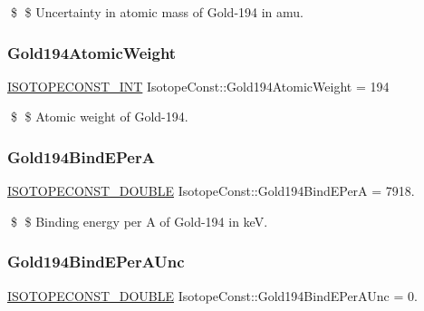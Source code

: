 \$ \$ Uncertainty in atomic mass of Gold-\/194 in amu. \mbox{\label{group___isotope_const-_gold-_au194_gaf6e772e3ead76240089b079afa13c11d}} 
\subsubsection{\texorpdfstring{Gold194\+Atomic\+Weight}{Gold194AtomicWeight}}
{\footnotesize\ttfamily \mbox{\hyperlink{group___isotope_const-_macros_ga5f18360b3e99483a35c32d789e62621c}{I\+S\+O\+T\+O\+P\+E\+C\+O\+N\+S\+T\+\_\+\+I\+NT}} Isotope\+Const\+::\+Gold194\+Atomic\+Weight = 194}

\$ \$ Atomic weight of Gold-\/194. \mbox{\label{group___isotope_const-_gold-_au194_ga600d1b0178a7d90eee789fe9be4b5f11}} 
\subsubsection{\texorpdfstring{Gold194\+Bind\+E\+PerA}{Gold194BindEPerA}}
{\footnotesize\ttfamily \mbox{\hyperlink{group___isotope_const-_macros_ga8f45a7272ce02c0b4c65c44636ed719a}{I\+S\+O\+T\+O\+P\+E\+C\+O\+N\+S\+T\+\_\+\+D\+O\+U\+B\+LE}} Isotope\+Const\+::\+Gold194\+Bind\+E\+PerA = 7918.}

\$ \$ Binding energy per A of Gold-\/194 in keV. \mbox{\label{group___isotope_const-_gold-_au194_ga14374373e4e5abeb0815a3c6f5be77f5}} 
\subsubsection{\texorpdfstring{Gold194\+Bind\+E\+Per\+A\+Unc}{Gold194BindEPerAUnc}}
{\footnotesize\ttfamily \mbox{\hyperlink{group___isotope_const-_macros_ga8f45a7272ce02c0b4c65c44636ed719a}{I\+S\+O\+T\+O\+P\+E\+C\+O\+N\+S\+T\+\_\+\+D\+O\+U\+B\+LE}} Isotope\+Const\+::\+Gold194\+Bind\+E\+Per\+A\+Unc = 0.}

